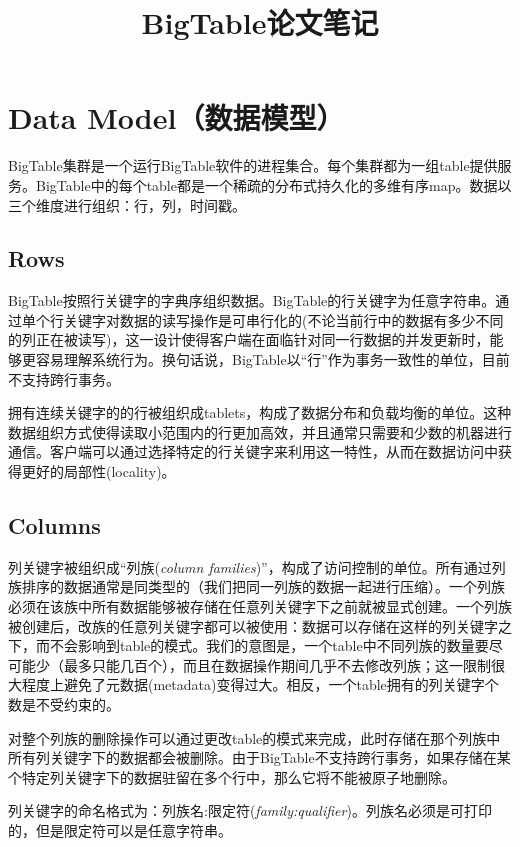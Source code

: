 \documentclass{article}
\begin{document}
\title{BigTable论文笔记}
\date{}
\maketitle

\section{Data Model（数据模型）}
BigTable集群是一个运行BigTable软件的进程集合。每个集群都为一组table提供服务。BigTable中的每个table都是一个稀疏的分布式持久化的多维有序map。数据以三个维度进行组织：行，列，时间戳。

\subsection{Rows}
BigTable按照行关键字的字典序组织数据。BigTable的行关键字为任意字符串。通过单个行关键字对数据的读写操作是可串行化的(不论当前行中的数据有多少不同的列正在被读写)，这一设计使得客户端在面临针对同一行数据的并发更新时，能够更容易理解系统行为。换句话说，BigTable以“行”作为事务一致性的单位，目前不支持跨行事务。\par
拥有连续关键字的的行被组织成tablets，构成了数据分布和负载均衡的单位。这种数据组织方式使得读取小范围内的行更加高效，并且通常只需要和少数的机器进行通信。客户端可以通过选择特定的行关键字来利用这一特性，从而在数据访问中获得更好的局部性(locality)。

\subsection{Columns}
列关键字被组织成“列族(\emph{column families})”，构成了访问控制的单位。所有通过列族排序的数据通常是同类型的（我们把同一列族的数据一起进行压缩）。一个列族必须在该族中所有数据能够被存储在任意列关键字下之前就被显式创建。一个列族被创建后，改族的任意列关键字都可以被使用：数据可以存储在这样的列关键字之下，而不会影响到table的模式。我们的意图是，一个table中不同列族的数量要尽可能少（最多只能几百个），而且在数据操作期间几乎不去修改列族；这一限制很大程度上避免了元数据(metadata)变得过大。相反，一个table拥有的列关键字个数是不受约束的。\par
对整个列族的删除操作可以通过更改table的模式来完成，此时存储在那个列族中所有列关键字下的数据都会被删除。由于BigTable不支持跨行事务，如果存储在某个特定列关键字下的数据驻留在多个行中，那么它将不能被原子地删除。\par
列关键字的命名格式为：列族名:限定符(\emph{family:qualifier})。列族名必须是可打印的，但是限定符可以是任意字符串。
\end{document}

